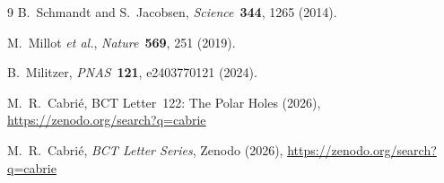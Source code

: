 \documentclass[aps,prl,twocolumn,superscriptaddress,floatfix]{revtex4-2}
\begin{document}
\begin{thebibliography}{9}
B.~Schmandt and S.~Jacobsen,
\textit{Science}~\textbf{344}, 1265 (2014).

M.~Millot \textit{et al.},
\textit{Nature}~\textbf{569}, 251 (2019).

B.~Militzer, \textit{PNAS}~\textbf{121}, e2403770121 (2024).

M.~R.~Cabri\'{e}, BCT Letter~122: The Polar Holes (2026),
\url{https://zenodo.org/search?q=cabrie}

M.~R.~Cabri\'{e}, \textit{BCT Letter Series}, Zenodo (2026),
\url{https://zenodo.org/search?q=cabrie}
\end{thebibliography}
\end{document}
